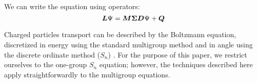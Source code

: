 We can write the equation using operators:
\begin{equation}
\bs{L}\Psi = \bs{M\Sigma D}\Psi + \bs{Q}
\label{transport_operator}
\end{equation}

Charged particles transport can be described by the Boltzmann equation, 
discretized in energy using the standard multigroup method
and in angle using the discrete ordinate method ($S_n$)
\cite{morel_81,galerkin_morel,cepxs}. For the purpose of this paper, 
we restrict ourselves to the one-group $S_n$ equation; however, the techniques described here
apply straightforwardly to the multigroup equations.

